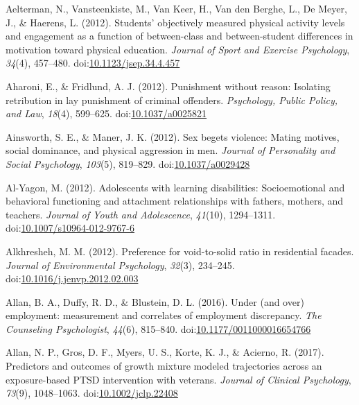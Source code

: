 \documentclass[english,man]{apa6}
\theoremstyle{definition}
\theoremstyle{definition}
\theoremstyle{definition}
\theoremstyle{remark}
\begin{document}
\hypertarget{ref-Aelterman2012}{}
Aelterman, N., Vansteenkiste, M., Van Keer, H., Van den Berghe, L., De
Meyer, J., \& Haerens, L. (2012). Students' objectively measured
physical activity levels and engagement as a function of between-class
and between-student differences in motivation toward physical education.
\emph{Journal of Sport and Exercise Psychology}, \emph{34}(4), 457--480.
doi:\href{https://doi.org/10.1123/jsep.34.4.457}{10.1123/jsep.34.4.457}

\hypertarget{ref-Aharoni2012}{}
Aharoni, E., \& Fridlund, A. J. (2012). Punishment without reason:
Isolating retribution in lay punishment of criminal offenders.
\emph{Psychology, Public Policy, and Law}, \emph{18}(4), 599--625.
doi:\href{https://doi.org/10.1037/a0025821}{10.1037/a0025821}

\hypertarget{ref-Ainsworth}{}
Ainsworth, S. E., \& Maner, J. K. (2012). Sex begets violence: Mating
motives, social dominance, and physical aggression in men. \emph{Journal
of Personality and Social Psychology}, \emph{103}(5), 819--829.
doi:\href{https://doi.org/10.1037/a0029428}{10.1037/a0029428}

\hypertarget{ref-Al-Yagon2012}{}
Al-Yagon, M. (2012). Adolescents with learning disabilities:
Socioemotional and behavioral functioning and attachment relationships
with fathers, mothers, and teachers. \emph{Journal of Youth and
Adolescence}, \emph{41}(10), 1294--1311.
doi:\href{https://doi.org/10.1007/s10964-012-9767-6}{10.1007/s10964-012-9767-6}

\hypertarget{ref-Alkhresheh2012}{}
Alkhresheh, M. M. (2012). Preference for void-to-solid ratio in
residential facades. \emph{Journal of Environmental Psychology},
\emph{32}(3), 234--245.
doi:\href{https://doi.org/10.1016/j.jenvp.2012.02.003}{10.1016/j.jenvp.2012.02.003}

\hypertarget{ref-Allan2016}{}
Allan, B. A., Duffy, R. D., \& Blustein, D. L. (2016). Under (and over)
employment: measurement and correlates of employment discrepancy.
\emph{The Counseling Psychologist}, \emph{44}(6), 815--840.
doi:\href{https://doi.org/10.1177/0011000016654766}{10.1177/0011000016654766}

\hypertarget{ref-Allan2017}{}
Allan, N. P., Gros, D. F., Myers, U. S., Korte, K. J., \& Acierno, R.
(2017). Predictors and outcomes of growth mixture modeled trajectories
across an exposure-based PTSD intervention with veterans. \emph{Journal
of Clinical Psychology}, \emph{73}(9), 1048--1063.
doi:\href{https://doi.org/10.1002/jclp.22408}{10.1002/jclp.22408}
\end{document}
